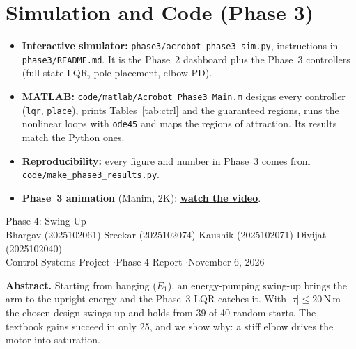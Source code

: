 \documentclass[10pt,letterpaper]{article}
\newcommand{\Nm}{\,\mathrm{N\,m}}
\newenvironment{keep}{\par\noindent\begin{minipage}{\linewidth}}{\end{minipage}\par\smallskip}
\begin{document}
\begin{keep}
\section{Simulation and Code (Phase 3)}
\begin{itemize}
\item \textbf{Interactive simulator:} \texttt{phase3/acrobot\_phase3\_sim.py}, instructions in \texttt{phase3/README.md}. It is the Phase~2 dashboard plus the Phase~3 controllers (full-state LQR, pole placement, elbow PD).
\item \textbf{MATLAB:} \texttt{code/matlab/Acrobot\_Phase3\_Main.m} designs every controller (\texttt{lqr}, \texttt{place}), prints Tables~\ref{tab:ctrl} and the guaranteed regions, runs the nonlinear loops with \texttt{ode45} and maps the regions of attraction. Its results match the Python ones.
\item \textbf{Reproducibility:} every figure and number in Phase~3 comes from \texttt{code/make\_phase3\_results.py}.
\item \textbf{Phase~3 animation} (Manim, 2K): \href{https://drive.google.com/file/d/1c-7Yy664ZP4TCJIeDbrAmFozHC8frao1/view?usp=sharing}{\textcolor{blue!60!black}{\textbf{watch the video}}}.
\end{itemize}
\end{keep}


\clearpage
{}\label{phase4}
\begin{center}
\begin{singlespace}
{\fontsize{17}{20}\selectfont Phase 4: Swing-Up}\\[4pt]
{\small Bhargav (2025102061) \quad Sreekar (2025102074) \quad Kaushik (2025102071) \quad Divijat (2025102040)}\\[1pt]
{\footnotesize Control Systems Project \quad$\cdot$\quad Phase 4 Report \quad$\cdot$\quad November 6, 2026}
\end{singlespace}
\end{center}
\vspace{-6pt}
{\small\textbf{Abstract.} Starting from hanging ($E_1$), an energy-pumping swing-up brings the arm to the upright energy and the Phase~3 LQR catches it. With $|\tau|\le20\Nm$ the chosen design swings up and holds from 39 of 40 random starts. The textbook gains succeed in only 25, and we show why: a stiff elbow drives the motor into saturation.\par}
\end{document}
